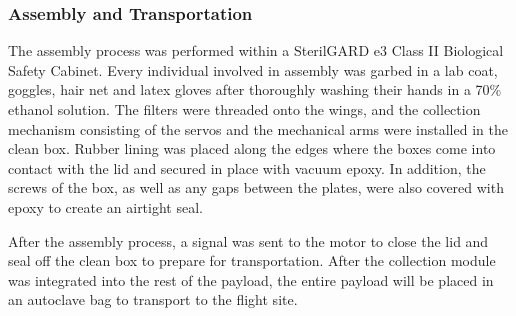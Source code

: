 \subsubsection{Assembly and Transportation}
\label{sec:Assembly}
The assembly process was performed within a SterilGARD e3 Class II Biological Safety Cabinet. Every individual involved in assembly was garbed in a lab coat, goggles, hair net and latex gloves after thoroughly washing their hands in a 70\% ethanol solution. The filters were threaded onto the wings, and the collection mechanism consisting of the servos and the mechanical arms were installed in the clean box. Rubber lining was placed along the edges where the boxes come into contact with the lid and secured in place with vacuum epoxy. In addition, the screws of the box, as well as any gaps between the plates, were also covered with epoxy to create an airtight seal. 

After the assembly process, a signal was sent to the motor to close the lid and seal off the clean box to prepare for transportation. After the collection module was integrated into the rest of the payload, the entire payload will be placed in an autoclave bag to transport to the flight site.

